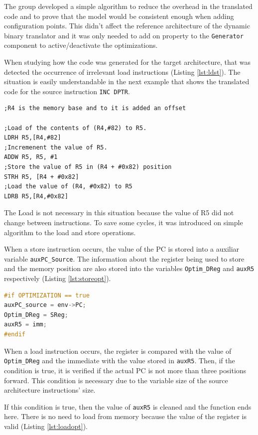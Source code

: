 \par The group developed a simple algorithm to reduce the overhead in the translated code and to prove that the model would be consistent enough when adding configuration points. This didn't affect the reference architecture of the dynamic binary translator and it was only needed to add on property to the \texttt{Generator} component to active/deactivate the optimizations.
\par When studying how the code was generated for the target architecture, that was detected the occurrence of irrelevant load instructions (Listing \ref{lst:ldst}). The situation is easily understandable in the next example that shows the translated code for the source instruction \texttt{INC DPTR}.
\begin{lstlisting}[language={[x86masm]Assembler},caption=Fragment of the generated code from DBT.,label=lst:ldst]
;R4 is the memory base and to it is added an offset

;Load of the contents of (R4,#82) to R5.	
LDRH R5,[R4,#82]
;Incremenent the value of R5.
ADDW R5, R5, #1
;Store the value of R5 in (R4 + #0x82) position
STRH R5, [R4 + #0x82]
;Load the value of (R4, #0x82) to R5
LDRB R5,[R4,#0x82]
\end{lstlisting}

\par The Load is not necessary in this situation because the value of R5 did not change between instructions. To save some cycles, it was introduced on simple algorithm to the load and store operations.
\par When a store instruction occurs, the value of the PC is stored into a auxiliar variable \texttt{auxPC\_Source}. The information about the register being used to store and the memory position are also stored into the variables \texttt{Optim\_DReg} and \texttt{auxR5} respectively (Listing \ref{lst:storeopt}). 

\begin{lstlisting}[language=C++,caption=Store function optimization code.,label=lst:storeopt]
#if OPTIMIZATION == true
auxPC_source = env->PC;
Optim_DReg = SReg;
auxR5 = imm; 
#endif
\end{lstlisting}
\par When a load instruction occurs, the register is compared with the value of \texttt{Optim\_DReg} and the immediate with the value stored in \texttt{auxR5}. Then, if the condition is true, it is verified if the actual PC is not more than three positions forward. This condition is necessary due to the variable size of the source architecture instructions' size. 
\par If this condition is true, then the value of \texttt{auxR5} is cleaned and the function ends here. There is no need to load from memory because the value of the register is valid (Listing \ref{lst:loadopt}). 

